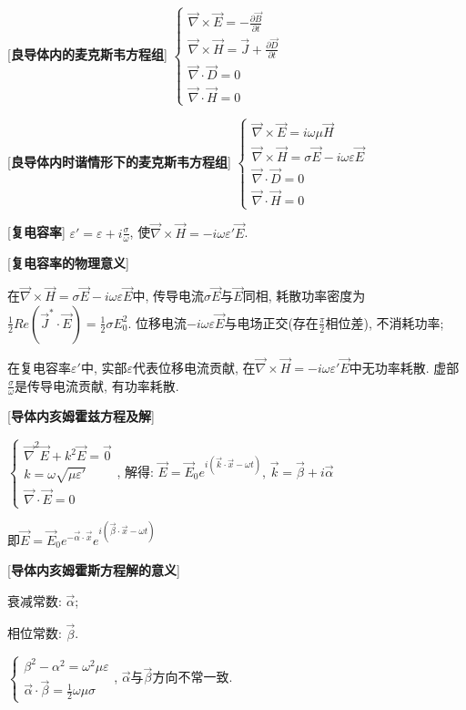 [\textbf{良导体内的麦克斯韦方程组}] $\begin{cases}\vec\nabla\times\vec E=-\frac{\partial\vec B}{\partial t}\\\vec\nabla\times\vec H=\vec J+\frac{\partial \vec D}{\partial t}\\\vec\nabla\cdot\vec D=0\\\vec\nabla\cdot\vec H=0 \end{cases}$

[\textbf{良导体内时谐情形下的麦克斯韦方程组}] $\begin{cases}\vec\nabla\times\vec E=i\omega\mu\vec H\\\vec\nabla\times\vec H=\sigma\vec E-i\omega\varepsilon\vec E\\\vec\nabla\cdot\vec D=0\\\vec\nabla\cdot\vec H=0 \end{cases}$

[\textbf{复电容率}] $\varepsilon'=\varepsilon+i\frac{\sigma}{\omega}$, 使$\vec\nabla\times\vec H=-i\omega\varepsilon'\vec E$.\par

[\textbf{复电容率的物理意义}]\par
\qquad 在$\vec\nabla\times\vec H=\sigma\vec E-i\omega\varepsilon\vec E$中, 传导电流$\sigma\vec E$与$\vec E$同相, 耗散功率密度为$\frac{1}{2}Re(\vec J^*\cdot\vec E)=\frac{1}{2}\sigma E_0^2$. 位移电流$-i\omega\varepsilon\vec E$与电场正交(存在$\frac{\pi}{2}$相位差), 不消耗功率;\par
\qquad 在复电容率$\varepsilon'$中, 实部$\varepsilon$代表位移电流贡献, 在$\vec\nabla\times\vec H=-i\omega\varepsilon'\vec E$中无功率耗散. 虚部$\frac{\sigma}{\omega}$是传导电流贡献, 有功率耗散.\par

[\textbf{导体内亥姆霍兹方程及解}]\par
\qquad $\begin{cases}\vec\nabla^2\vec E+k^2\vec E=\vec 0\\k=\omega\sqrt{\mu\varepsilon'}\\\vec\nabla\cdot\vec E=0\end{cases}$, 解得: $\vec E=\vec E_0e^{i(\vec k\cdot\vec x-\omega t)}$, $\vec k=\vec \beta+i\vec \alpha$\par
\qquad 即$\vec E=\vec E_0e^{-\vec \alpha \cdot\vec x}e^{i(\vec\beta\cdot\vec x-\omega t)}$

\clearpage

[\textbf{导体内亥姆霍斯方程解的意义}]\par
\qquad 衰减常数: $\vec\alpha$;\par
\qquad 相位常数: $\vec\beta$.\par
\qquad \qquad $\begin{cases}\beta^2-\alpha^2=\omega^2\mu\varepsilon\\\vec\alpha\cdot\vec\beta=\frac{1}{2}\omega\mu\sigma \end{cases}$, $\vec\alpha$与$\vec\beta$方向不常一致.\par

